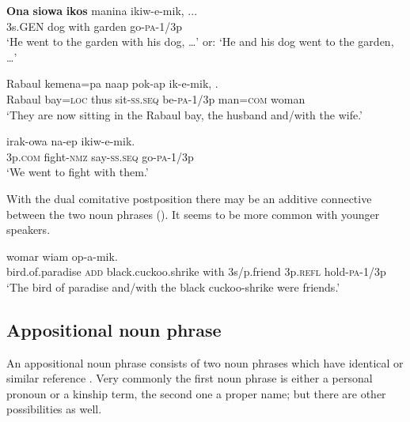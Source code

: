\ea%
\label{ex:x819}
\gll \textbf{Ona} \textbf{siowa} \textbf{ikos}  manina  ikiw-e-mik, ... \\
  3s.GEN  dog  with  garden  go-\textsc{pa}-1/3p    \\
\glt`He went to the garden with his dog, {\dots}' or: `He and his dog went to the garden, {\dots}'
\z





\ea%
\label{ex:x832}
\gll Rabaul  kemena=pa  naap  pok-ap  ik-e-mik,   . \\
    Rabaul  bay=\textsc{loc}  thus  sit-\textsc{ss}.\textsc{seq}  be-\textsc{pa}-1/3p  man=\textsc{com}  woman  \\
\glt`They are now sitting in the Rabaul bay, the husband and/with the wife.'
\z





\ea%
\label{ex:x831}
\gll {}  irak-owa  na-ep  ikiw-e-mik. \\
  3p.\textsc{com}  fight-\textsc{nmz}  say-\textsc{ss}.\textsc{seq}  go-\textsc{pa}-1/3p    \\
\glt`We went to fight with them.'
\z





With the dual comitative postposition   there may be an additive connective  between the two noun phrases (). It seems to be more common with younger speakers. 

\ea%
\label{ex:x820}
\gll {}     womar wiam  op-a-mik. \\
   bird.of.paradise  \textsc{add}  black.cuckoo.shrike  with  3s/p.friend  3p.\textsc{refl}  hold-\textsc{pa}-1/3p   \\
\glt`The bird of paradise and/with the black cuckoo-shrike were friends.'
\z









\subsection{Appositional noun phrase}
{}
An appositional noun phrase consists of two noun phrases which have identical or similar reference \citep[24]{Crystal1997}.  Very commonly the first noun phrase is either a personal pronoun or a kinship term, the second one a proper name; but there are other possibilities as well.  

